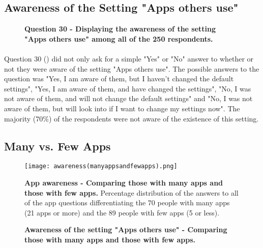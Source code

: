 \subsection{Awareness of the Setting "Apps others use"}

\begin{figure}[t]
\centering
{}
\caption[Question 30 - Displaying the awareness of the setting "Apps others use" among all of the 250 respondents]{\textbf{Question 30 - Displaying the awareness of the setting "Apps others use" among all of the 250 respondents.}} 
\label{fig:appsothersuse}
\end{figure}

\paragraph{}
Question 30 () did not only ask for a simple "Yes" or "No" answer to whether or not they were aware of the setting "Apps others use". The possible answers to the question was "Yes, I am aware of them, but I haven't changed the default settings", "Yes, I am aware of them, and have changed the settings", "No, I was not aware of them, and will not change the default settings" and "No, I was not aware of them, but will look into if I want to change my settings now". The majority (70\%) of the respondents were not aware of the existence of this setting. 


\subsection{Many vs. Few Apps}

\begin{figure}[t]
\centering
\texttt{[image: awareness(manyappsandfewapps).png]}
\caption[App awareness - Comparing those with many apps and those with few apps]{\textbf{App awareness - Comparing those with many apps and those with few apps.} Percentage distribution of the answers to all of the app questions differentiating the 70 people with many apps (21 apps or more) and the 89 people with few apps (5 or less).} 
\label{fig:manyappsandfewapps}
\end{figure}

\begin{figure}[h!]
\centering
{}
\caption[Awareness of the setting "Apps others use" - Comparing those with many apps and those with few apps]{\textbf{Awareness of the setting "Apps others use" - Comparing those with many apps and those with few apps.}} 
\label{fig:appsothersusemanyfew}
\end{figure}

